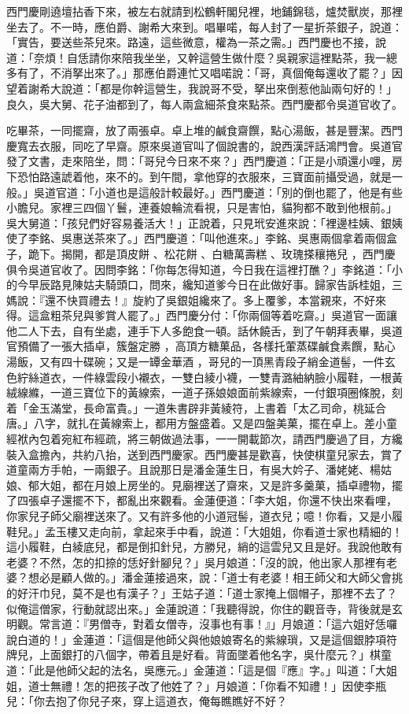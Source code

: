 \begin{showcontents}{}
西門慶剛遶壇拈香下來，被左右就請到松鶴軒閣兒裡，地鋪錦毯，爐焚獸炭，那裡坐去了。不一時，應伯爵、謝希大來到。唱畢喏，每人封了一星折茶銀子，說道：「實告，要送些茶兒來。路遠，這些微意，權為一茶之需。」西門慶也不接，說道：「奈煩！自恁請你來陪我坐坐，又幹這營生做什麼？吳親家這裡點茶，我一總多有了，不消拏出來了。」那應伯爵連忙又唱喏說：「哥，真個俺每還收了罷？」因望着謝希大說道：「都是你幹這營生，我說哥不受，拏出來倒惹他訕兩句好的！」良久，吳大舅、花子油都到了，每人兩盒細茶食來點茶。西門慶都令吳道官收了。

吃畢茶，一同擺齋，放了兩張卓。卓上堆的鹹食齋饌，點心湯飯，甚是豐潔。西門慶寬去衣服，同吃了早齋。原來吳道官叫了個說書的，說西漢評話鴻門會。吳道官發了文書，走來陪坐，問：「哥兒今日來不來？」西門慶道：「正是小頑還小哩，房下恐怕路遠諕着他，來不的。到午間，拿他穿的衣服來，三寶面前攝受過，就是一般。」吳道官道：「小道也是這般計較最好。」西門慶道：「別的倒也罷了，他是有些小膽兒。家裡三四個丫鬟，連養娘輪流看視，只是害怕，貓狗都不敢到他根前。」吳大舅道：「孩兒們好容易養活大！」正說着，只見玳安進來說：「裡邊桂姨、銀姨使了李銘、吳惠送茶來了。」西門慶道：「叫他進來。」李銘、吳惠兩個拿着兩個盒子，跪下。揭開，都是頂皮餅 、松花餅 、白糖萬壽糕 、玫瑰搽穰捲兒 ，西門慶俱令吳道官收了。因問李銘：「你每怎得知道，今日我在這裡打醮？」李銘道：「小的今早辰路見陳姑夫騎頭口，問來，纔知道爹今日在此做好事。歸家告訴桂姐，三媽說：『還不快買禮去！』旋約了吳銀姐纔來了。多上覆爹，本當親來，不好來得。這盒粗茶兒與爹賞人罷了。」西門慶分付：「你兩個等着吃齋。」吳道官一面讓他二人下去，自有坐處，連手下人多飽食一頓。話休饒舌，到了午朝拜表畢，吳道官預備了一張大插卓，簇盤定勝 ，高頂方糖菓品，各樣托葷蒸碟鹹食素饌，點心湯飯，又有四十碟碗；又是一罈金華酒 ，哥兒的一頂黑青段子綃金道髻，一件玄色紵絲道衣，一件綠雲段小襯衣，一雙白綾小襪，一雙青潞紬納臉小履鞋，一根黃絨線縧，一道三寶位下的黃線索，一道子孫娘娘面前紫線索，一付銀項圈條脫，刻着「金玉滿堂，長命富貴。」一道朱書辟非黃綾符，上書着「太乙司命，桃延合唐。」八字，就扎在黃線索上，都用方盤盛着。又是四盤美菓，擺在卓上。差小童經袱內包着宛紅布經疏，將三朝做過法事，一一開載節次，請西門慶過了目，方纔裝入盒擔內，共約八抬，送到西門慶家。西門慶甚是歡喜，快使棋童兒家去，賞了道童兩方手帕，一兩銀子。且說那日是潘金蓮生日，有吳大妗子、潘姥姥、楊姑娘、郁大姐，都在月娘上房坐的。見廟裡送了齋來，又是許多羹菓，插卓禮物，擺了四張卓子還擺不下，都亂出來觀看。金蓮便道：「李大姐，你還不快出來看哩，你家兒子師父廟裡送來了。又有許多他的小道冠髻，道衣兒；噫！你看，又是小履鞋兒。」孟玉樓又走向前，拿起來手中看，說道：「大姐姐，你看道士家也精細的！這小履鞋，白綾底兒，都是倒扣針兒，方勝兒，綃的這雲兒又且是好。我說他敢有老婆？不然，怎的扣捺的恁好針腳兒？」吳月娘道：「沒的說，他出家人那裡有老婆？想必是顧人做的。」潘金蓮接過來，說：「道士有老婆！相王師父和大師父會挑的好汗巾兒，莫不是也有漢子？」王姑子道：「道士家掩上個帽子，那裡不去了？似俺這僧家，行動就認出來。」金蓮說道：「我聽得說，你住的觀音寺，背後就是玄明觀。常言道：『男僧寺，對着女僧寺，沒事也有事！』」月娘道：「這六姐好恁囉說白道的！」金蓮道：「這個是他師父與他娘娘寄名的紫線瑣，又是這個銀脖項符牌兒，上面銀打的八個字，帶着且是好看。背面墜着他名字，吳什麼元？」棋童道：「此是他師父起的法名，吳應元。」金蓮道：「這是個『應』字。」叫道：「大姐姐，道士無禮！怎的把孩子改了他姓了？」月娘道：「你看不知禮！」因使李瓶兒：「你去抱了你兒子來，穿上這道衣，俺每瞧瞧好不好？
\end{showcontents}
